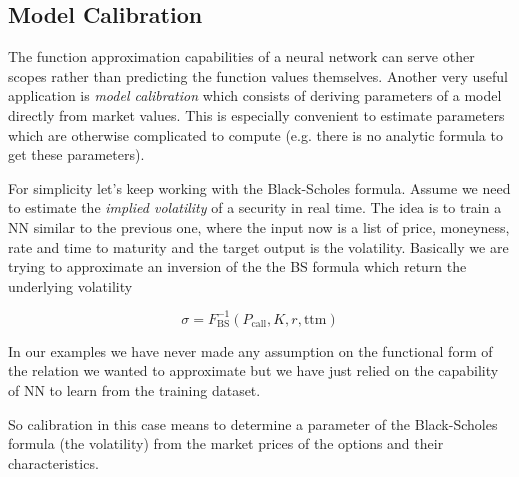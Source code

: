 \subsection{Model Calibration}\label{model-calibration}

The function approximation capabilities of a neural network can serve other scopes rather than predicting the function values themselves. Another very useful application is \emph{model calibration} which consists of deriving parameters of a model directly from market values. This is especially convenient to estimate parameters which are otherwise complicated to compute (e.g. there is no analytic formula to get these parameters).

For simplicity let's keep working with the Black-Scholes formula.
Assume we need to estimate the \emph{implied volatility} of a security in real time. 
The idea is to train a NN similar to the previous one, where the input now is a list of price, moneyness, rate and time to maturity and the target output is the volatility. Basically we are trying to approximate an inversion of the the BS formula which return the underlying volatility

\begin{equation} 
\sigma = F^{-1}_\textrm{BS}(P_\textrm{call}, K, r, \mathrm{ttm})
\end{equation}

In our examples we have never made any assumption on the functional form of the relation we wanted to approximate but we have just relied on the capability of NN to learn from the training dataset. 

So calibration in this case means to determine a parameter of the Black-Scholes formula (the volatility) from the market prices of the options and their characteristics.

